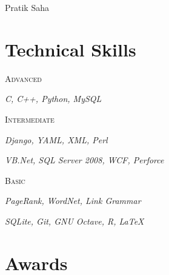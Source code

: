 \documentclass[]{article}
\begin{document}
{\selectfont\Large Pratik Saha}
	
{\Mobilefone}\hspace{4pt}{webversion}
	
{}
	
{\Mundus}

\section{Technical Skills}

{\raggedright\textsc{Advanced} } \hfill {\raggedleft\textit{C, C++, Python, MySQL}}

{\raggedright\textsc{Intermediate}} \hfill {\raggedleft\textit{Django, YAML, XML, Perl}}

\hfill{\raggedleft\textit{VB.Net, SQL Server 2008, WCF, Perforce}}

{\raggedright\textsc{Basic}} \hfill {\raggedleft\textit{PageRank, WordNet, Link Grammar}}

\hfill{\raggedleft\textit{SQLite, Git, GNU Octave, R,  \LaTeX}}

\section{Awards}
\end{document}
